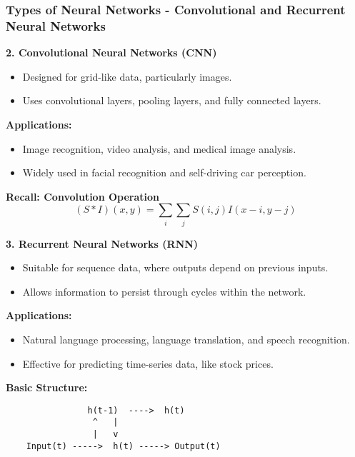 \documentclass[aspectratio=169]{beamer}
\begin{document}
\begin{frame}[fragile]
    \frametitle{Types of Neural Networks - Convolutional and Recurrent Neural Networks}
    \textbf{2. Convolutional Neural Networks (CNN)}
    \begin{itemize}
        \item Designed for grid-like data, particularly images.
        \item Uses convolutional layers, pooling layers, and fully connected layers.
    \end{itemize}
    \textbf{Applications:}
    \begin{itemize}
        \item Image recognition, video analysis, and medical image analysis.
        \item Widely used in facial recognition and self-driving car perception.
    \end{itemize}

    \textbf{Recall: Convolution Operation}
    \begin{equation}
        (S * I)(x, y) = \sum_{i}\sum_{j} S(i, j) I(x - i, y - j)
    \end{equation}

    \textbf{3. Recurrent Neural Networks (RNN)}
    \begin{itemize}
        \item Suitable for sequence data, where outputs depend on previous inputs.
        \item Allows information to persist through cycles within the network.
    \end{itemize}
    \textbf{Applications:}
    \begin{itemize}
        \item Natural language processing, language translation, and speech recognition.
        \item Effective for predicting time-series data, like stock prices.
    \end{itemize}

    \textbf{Basic Structure:}
    \begin{verbatim}
                h(t-1)  ---->  h(t)
                 ^   |
                 |   v
    Input(t) ----->  h(t) -----> Output(t)
    \end{verbatim}
\end{frame}
\end{document}
